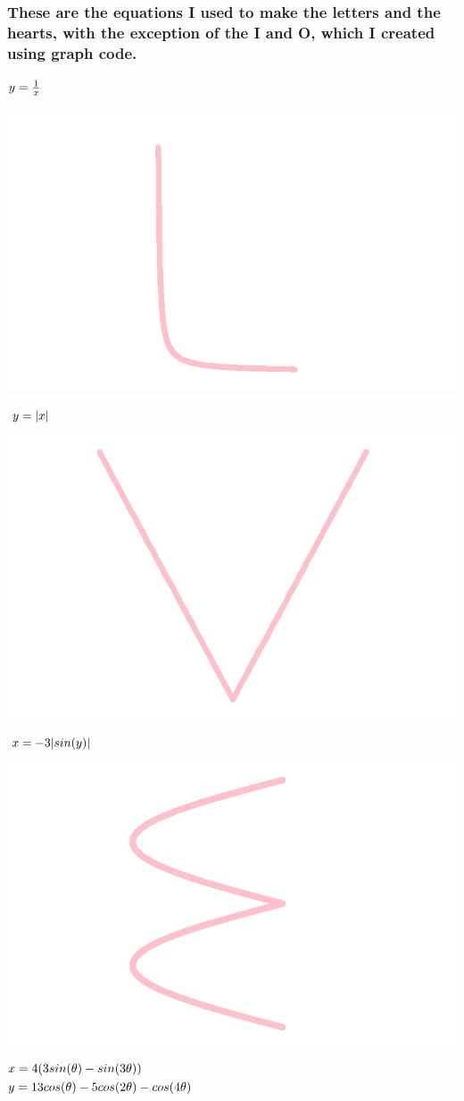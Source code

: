 \documentclass[
]{article}
\begin{document}
\hypertarget{these-are-the-equations-i-used-to-make-the-letters-and-the-hearts-with-the-exception-of-the-i-and-o-which-i-created-using-graph-code.}{%
\subsubsection{These are the equations I used to make the letters and
the hearts, with the exception of the I and O, which I created using
graph
code.}\label{these-are-the-equations-i-used-to-make-the-letters-and-the-hearts-with-the-exception-of-the-i-and-o-which-i-created-using-graph-code.}}

\(\LARGE y = \frac{1}{x} \hspace{8cm}\)

\includegraphics[width=0.5\linewidth]{L}

\(\LARGE y=\lvert x\rvert \hspace{8cm}\)

\includegraphics[width=0.5\linewidth]{V}

\(\LARGE x=-3\lvert sin(y)\rvert \hspace{6cm}\)

\includegraphics[width=0.5\linewidth]{E}

\(\begin{align} & \LARGE x=4(3sin(\theta) - sin(3\theta))\\ &\LARGE y=13cos(\theta) - 5cos(2\theta) - cos(4\theta) \end{align}\)
\end{document}
